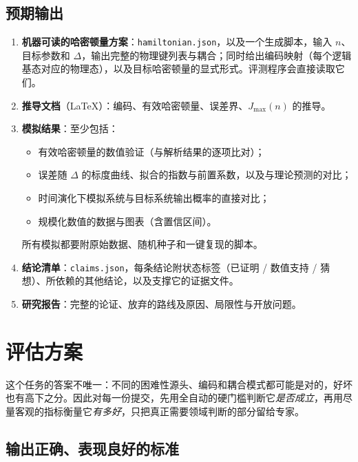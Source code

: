 \documentclass[11pt,a4paper,fontset=none]{ctexart}
\begin{document}
\subsection{预期输出}

\begin{enumerate}[label=(\arabic*)]
  \item \textbf{机器可读的哈密顿量方案}：\texttt{hamiltonian.json}，以及一个生成脚本，输入 $n$、目标参数和 $\Delta$，输出完整的物理键列表与耦合；同时给出编码映射（每个逻辑基态对应的物理态），以及目标哈密顿量的显式形式。评测程序会直接读取它们。
  \item \textbf{推导文档}（LaTeX）：编码、有效哈密顿量、误差界、$J_{\max}(n)$ 的推导。
  \item \textbf{模拟结果}：至少包括：
  \begin{itemize}
    \item 有效哈密顿量的数值验证（与解析结果的逐项比对）；
    \item 误差随 $\Delta$ 的标度曲线、拟合的指数与前置系数，以及与理论预测的对比；
    \item 时间演化下模拟系统与目标系统输出概率的直接对比；
    \item 规模化数值的数据与图表（含置信区间）。
  \end{itemize}
  所有模拟都要附原始数据、随机种子和一键复现的脚本。
  \item \textbf{结论清单}：\texttt{claims.json}，每条结论附状态标签（已证明 / 数值支持 / 猜想）、所依赖的其他结论，以及支撑它的证据文件。
  \item \textbf{研究报告}：完整的论证、放弃的路线及原因、局限性与开放问题。
\end{enumerate}

\section{评估方案}

这个任务的答案不唯一：不同的困难性源头、编码和耦合模式都可能是对的，好坏也有高下之分。因此对每一份提交，先用全自动的硬门槛判断它\emph{是否成立}，再用尽量客观的指标衡量它\emph{有多好}，只把真正需要领域判断的部分留给专家。

\subsection{输出正确、表现良好的标准}
\end{document}
